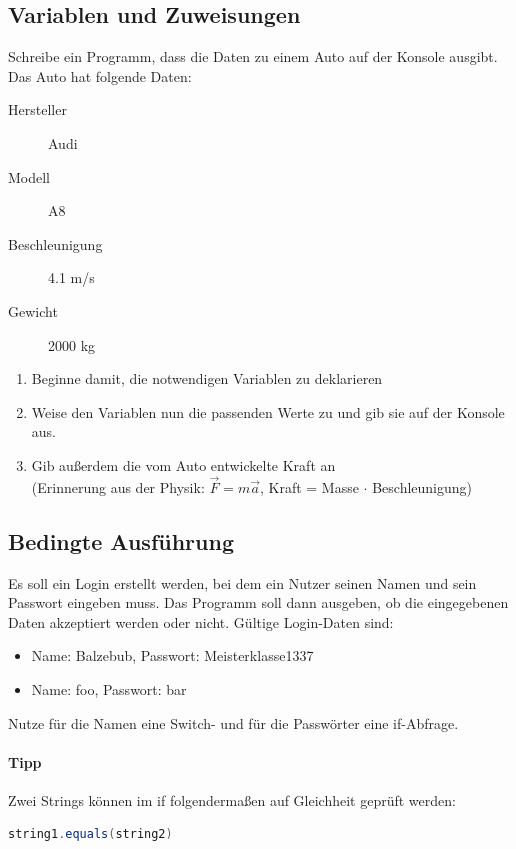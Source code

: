 \documentclass[11pt, a4paper]{article}
\begin{document}
\subsection{Variablen und Zuweisungen}
Schreibe ein Programm, dass die Daten zu einem Auto auf der Konsole ausgibt. Das Auto hat folgende Daten:
\begin{description}
	\item[Hersteller] Audi
	\item[Modell] A8
	\item[Beschleunigung] 4.1 m/s
	\item[Gewicht] 2000 kg
\end{description}
\begin{enumerate}
	\item Beginne damit, die notwendigen Variablen zu deklarieren
	\item Weise den Variablen nun die passenden Werte zu und gib sie auf der Konsole aus.
	\item Gib außerdem die vom Auto entwickelte Kraft an \\
	(Erinnerung aus der Physik: $\vec{F}=m\vec{a}$, Kraft = Masse $\cdot$ Beschleunigung)
\end{enumerate}



\subsection{Bedingte Ausführung}
Es soll ein Login erstellt werden, bei dem ein Nutzer seinen Namen und sein Passwort eingeben muss. Das Programm soll dann ausgeben, ob die eingegebenen Daten akzeptiert werden oder nicht. Gültige Login-Daten sind:
\begin{itemize}
	\item Name: Balzebub, Passwort: Meisterklasse1337
	\item Name: foo, Passwort: bar
\end{itemize}
Nutze für die Namen eine Switch- und für die Passwörter eine if-Abfrage.
\paragraph{Tipp} Zwei Strings können im if folgendermaßen auf Gleichheit geprüft werden:
\begin{lstlisting}[language=Java]
	string1.equals(string2)
\end{lstlisting}


\end{document}
